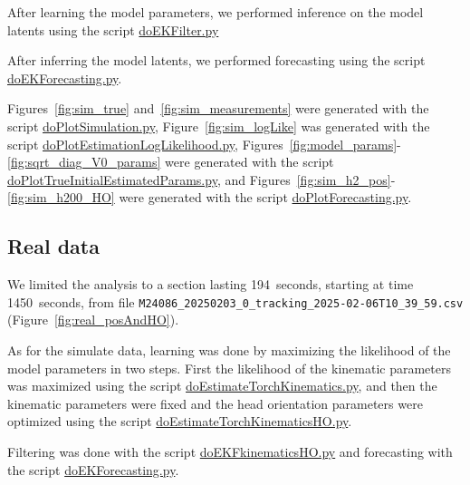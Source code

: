 \documentclass[12pt]{article}
\begin{document}
After learning the model parameters, we performed inference on the model latents
using the script
\href{https://github.com/joacorapela/lds_simulations/blob/master/code/scripts/doEKFilter.py}{doEKFilter.py}

After inferring the model latents, we performed forecasting using the script
\href{https://github.com/joacorapela/lds_simulations/blob/master/code/scripts/doEKForecasting.py}{doEKForecasting.py}.

Figures~\ref{fig:sim_true} and~\ref{fig:sim_measurements} were generated with
the script
\href{https://github.com/joacorapela/lds_simulations/blob/master/code/scripts/doPlotSimulation.py}{doPlotSimulation.py},
Figure~\ref{fig:sim_logLike} was generated with the script
    \href{https://github.com/joacorapela/lds_simulations/blob/master/code/scripts/doPlotEstimationLogLikelihood.py}{doPlotEstimationLogLikelihood.py},
    Figures~\ref{fig:model_params}-\ref{fig:sqrt_diag_V0_params} were generated
    with the script
    \href{https://github.com/joacorapela/lds_simulations/blob/master/code/scripts/doPlotTrueInitialEstimatedParams.py}{doPlotTrueInitialEstimatedParams.py},
and Figures~\ref{fig:sim_h2_pos}-\ref{fig:sim_h200_HO} were generated with the
script
\href{https://github.com/joacorapela/lds_simulations/blob/master/code/scripts/doPlotForecasting.py}{doPlotForecasting.py}.

\subsection{Real data}

We limited the analysis to a section lasting 194~seconds, starting at time
1450~seconds, from file
\texttt{M24086\_20250203\_0\_tracking\_2025-02-06T10\_39\_59.csv}
(Figure~\ref{fig:real_posAndHO}).

As for the simulate data, learning was done by maximizing the likelihood of the
model parameters in two steps. First the likelihood of the kinematic parameters
was maximized using the script
\href{https://github.com/joacorapela/lds_tracking_posOriMice/blob/master/code/scripts/doEstimateTorchKinematics.py}{doEstimateTorchKinematics.py},
and then the kinematic parameters were fixed and the head orientation
parameters were optimized using the script
\href{https://github.com/joacorapela/lds_tracking_posOriMice/blob/master/code/scripts/doEstimateTorchKinematicsHO.py}{doEstimateTorchKinematicsHO.py}.

Filtering was done with the script
\href{https://github.com/joacorapela/lds_tracking_posOriMice/blob/master/code/scripts/doEKFkinematicsHO.py}{doEKFkinematicsHO.py}
and forecasting with the script
\href{https://github.com/joacorapela/lds_tracking_posOriMice/blob/master/code/scripts/doEKForecasting.py}{doEKForecasting.py}.
\end{document}
